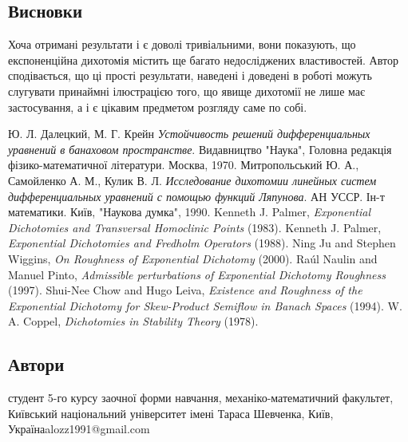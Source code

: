 \documentclass{SHVpaper}
\begin{document}
\subsection{Висновки}
Хоча отримані результати і є доволі тривіальними, вони показують, що експоненційна дихотомія містить ще багато недосліджених 
властивостей. Автор сподівається, що ці прості результати, наведені і доведені в роботі можуть слугувати принаймні ілюстрацією того, що
явище дихотомії не лише має застосування, а і є цікавим предметом розгляду саме по собі.

\begin{thebibliography}{9}

Ю. Л. Далецкий, М. Г. Крейн
\emph{Устойчивость решений дифференциальных уравнений в банаховом пространстве}.
Видавництво "Наука"{}, Головна редакція фізико-математичної літератури. Москва, 1970.
Митропольський Ю. А., Самойленко А. М., Кулик В. Л.
\emph{Исследование дихотомии линейных систем дифференциальных уравнений с помощью функций Ляпунова}.
АН УССР. Ін-т математики. Київ, "Наукова думка", 1990.
	Kenneth J. Palmer, {\em Exponential Dichotomies and Transversal Homoclinic Points} (1983).
	Kenneth J. Palmer, {\em Exponential Dichotomies and Fredholm Operators} (1988).
	Ning Ju and Stephen Wiggins, {\em On Roughness of Exponential Dichotomy} (2000).
	Ra\'ul Naulin and Manuel Pinto, {\em Admissible perturbations of Exponential Dichotomy Roughness} (1997).
	Shui-Nee Chow and Hugo Leiva, {\em Existence and Roughness of the Exponential Dichotomy for Skew-Product Semiflow in Banach Spaces} (1994).
	W. A. Coppel, {\em Dichotomies in Stability Theory} (1978).
\end{thebibliography}

\subsection{Автори}
\author{Олексій Костянтинович Леонтьєв}{студент 5-го курсу заочної форми навчання, механіко-математичний факультет,
Київський національний університет імені Тараса Шевченка, Київ, Україна}{alozz1991@gmail.com}
\end{document}
